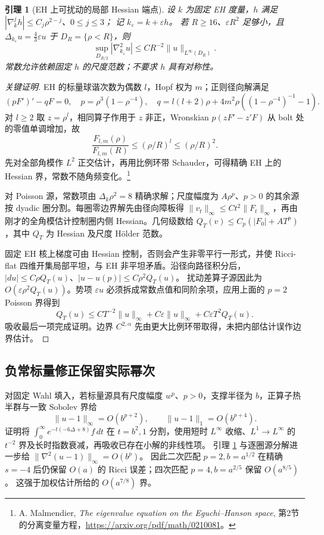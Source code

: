 \documentclass[UTF8,fontset=fandol,zihao=-4,oneside,openany]{ctexbook}
\theoremstyle{cjkplain}
\newtheorem{lemma}[theorem]{引理}
\numberwithin{equation}{chapter}
\begin{document}
\begin{lemma}[EH 上可扰动的局部 Hessian 端点]\label{FND:Hessian}
设 \(k\) 为固定 EH 度量，\(h\) 满足
\(|\nabla_k^jh|\le C_j\rho^{2-j}\)、\(0\le j\le3\)；
记 \(k_\varepsilon=k+\varepsilon h\)。
若 \(R\ge16\)、\(\varepsilon R^2\) 足够小，且
\(\Delta_{k_\varepsilon}u=\frac43\varepsilon u\) 于 \(D_R=\{\rho<R\}\)，则
\[
\sup_{D_{R/2}}|\nabla^2_{k_\varepsilon}u|
\le CR^{-2}\|u\|_{L^\infty(D_R)} .
\]
常数允许依赖固定 \(h\) 的尺度范数；不要求 \(h\) 具有对称性。
\end{lemma}
\begin{proof}[关键证明]
EH 的标量球谐次数为偶数 \(l\)，Hopf 权为 \(m\)；正则径向解满足
\[
(pF')'-qF=0,\quad
p=\rho^3(1-\rho^{-4}),\quad
q=l(l+2)\rho+4m^2\rho((1-\rho^{-4})^{-1}-1).
\]
对 \(l\ge2\) 取 \(z=\rho^l\)，相同算子作用于 \(z\) 非正，Wronskian
\(p(zF'-z'F)\) 从 bolt 处的零值单调增加，故
\[
\frac{F_{l,m}(\rho)}{F_{l,m}(R)}
\le(\rho/R)^l\le(\rho/R)^2 .
\]
先对全部角模作 \(L^2\) 正交估计，再用比例环带 Schauder，可得精确 EH 上的 Hessian 界，常数不随角频变化。\footnote{A. Malmendier, \emph{The eigenvalue equation on the Eguchi--Hanson space}, 第2节的分离变量方程，\url{https://arxiv.org/pdf/math/0210081}。}

对 Poisson 源，常数项由 \(\Delta_k\rho^2=8\) 精确求解；尺度幅度为 \(A\rho^p\)、\(p>0\) 的其余源按 dyadic 圈分割。每圈零边界解先由径向障板得
\(\|v_t\|_\infty\le Ct^2\|F_t\|_\infty\)，再由刚才的全角模估计控制圈内侧 Hessian。几何级数给
\(Q_T(v)\le C_p(|F_0|+AT^p)\)，其中 \(Q_T\) 为 Hessian 及尺度 Hölder 范数。

固定 EH 核上梯度可由 Hessian 控制，否则会产生非零平行一形式，并使 Ricci-flat 四维开集局部平坦，与 EH 非平坦矛盾。沿径向路径积分后，
\(|du|\le C\rho Q_T(u)\)、\(|u-u(p)|\le C\rho^2Q_T(u)\)。
扰动差算子源因此为 \(O(\varepsilon\rho^2Q_T(u))\)。势项
\(\varepsilon u\) 必须拆成常数点值和同阶余项，应用上面的 \(p=2\) Poisson 界得到
\[
Q_T(u)\le CT^{-2}\|u\|_\infty+
C\varepsilon\|u\|_\infty+
C\varepsilon T^2Q_T(u).
\]
吸收最后一项完成证明。边界 \(C^{2,\alpha}\) 先由更大比例环带取得，未把内部估计误作边界估计。
\end{proof}

\subsection{负常标量修正保留实际幂次}
对固定 Wahl 填入，若标量源具有尺度幅度 \(w^p\)、\(p>0\)，支撑半径为 \(b\)，正算子热半群与一致 Sobolev 界给
\[
\|u-1\|_\infty=O(b^{p+2}),\qquad
\|u-1\|_1=O(b^{p+4}).
\]
证明将 \(\int_0^\infty e^{-t(-6\Delta+8)}f\,dt\) 在 \(t=b^2,1\) 分割，使用短时 \(L^\infty\) 收缩、\(L^1\to L^\infty\) 的 \(t^{-2}\) 界及长时指数衰减，再吸收已存在小解的非线性项。
引理 \ref{FND:Hessian} 与逐圈源分解进一步给
\(\|\nabla^2(u-1)\|_\infty=O(b^p)\)。
因此二次匹配 \(p=2,b=a^{1/2}\) 在精确 \(s=-4\) 后仍保留 \(O(a)\) 的 Ricci 误差；四次匹配 \(p=4,b=a^{2/5}\) 保留 \(O(a^{8/5})\)。
这强于加权估计所给的 \(O(a^{7/8})\) 界。
\end{document}
